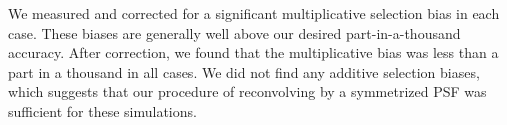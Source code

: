 \documentclass[iop]{emulateapj}
\newcommand{\snr}{$S/N$}
\newcommand{\Mcal}{\textsc{Metacalibration}}
\newcommand{\bdksim}{\texttt{BDK}}
\begin{document}
We measured and corrected for a significant multiplicative selection bias in
each case.  These biases are generally well above our desired
part-in-a-thousand accuracy.  After correction, we found that the
multiplicative bias was less than a part in a thousand in all cases.  We did
not find any additive selection biases, which suggests that our procedure of
reconvolving by a symmetrized PSF was sufficient for these simulations.

\end{document}
